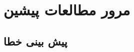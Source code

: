 \chapter{مرور مطالعات پیشین}

\label{chap:survey}

\section{پیش بینی خطا}
\label{sec:bug-predict}









